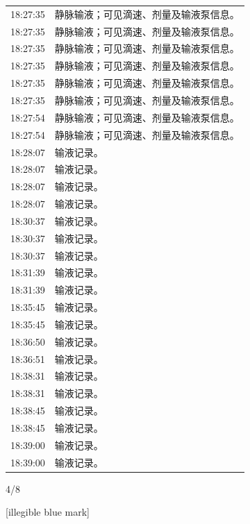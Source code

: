 \documentclass[UTF8,10pt,a4paper,fontset=fandol]{ctexart}
\newcommand{\handwritten}[1]{#1}
\begin{document}
\begin{center}
{\begin{minipage}{0.92\textheight}
\begin{tabularx}{\linewidth}{@{}lX@{}}
18:27:35 & 静脉输液；可见滴速、剂量及输液泵信息。\\
18:27:35 & 静脉输液；可见滴速、剂量及输液泵信息。\\
18:27:35 & 静脉输液；可见滴速、剂量及输液泵信息。\\
18:27:35 & 静脉输液；可见滴速、剂量及输液泵信息。\\
18:27:35 & 静脉输液；可见滴速、剂量及输液泵信息。\\
18:27:35 & 静脉输液；可见滴速、剂量及输液泵信息。\\
18:27:54 & 静脉输液；可见滴速、剂量及输液泵信息。\\
18:27:54 & 静脉输液；可见滴速、剂量及输液泵信息。\\
18:28:07 & 输液记录。\\
18:28:07 & 输液记录。\\
18:28:07 & 输液记录。\\
18:28:07 & 输液记录。\\
18:30:37 & 输液记录。\\
18:30:37 & 输液记录。\\
18:30:37 & 输液记录。\\
18:31:39 & 输液记录。\\
18:31:39 & 输液记录。\\
18:35:45 & 输液记录。\\
18:35:45 & 输液记录。\\
18:36:50 & 输液记录。\\
18:36:51 & 输液记录。\\
18:38:31 & 输液记录。\\
18:38:31 & 输液记录。\\
18:38:45 & 输液记录。\\
18:38:45 & 输液记录。\\
18:39:00 & 输液记录。\\
18:39:00 & 输液记录。\\
\end{tabularx}
\end{minipage}%
}
\end{center}

\handwritten{4/8}

\newpage

\handwritten{[illegible blue mark]}
\end{document}
